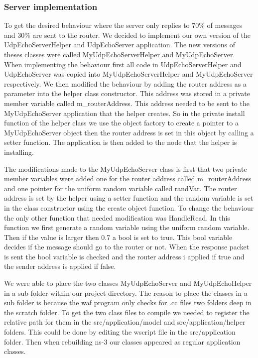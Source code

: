 \documentclass{article}
\begin{document}
\subsubsection{Server implementation}
To get the desired behaviour where the server only replies to 70\% of messages and 30\% are sent to the router.
We decided to implement our own version of the UdpEchoServerHelper and UdpEchoServer application.
The new versions of theses classes were called MyUdpEchoServerHelper and MyUdpEchoServer.
When implementing the behaviour first all code in UdpEchoServerHelper and UdpEchoServer was copied into MyUdpEchoServerHelper and MyUdpEchoServer respectively.
We then modified the behaviour by adding the router address as a parameter into the helper class constructor.
This address was stored in a private member variable called m\_routerAddress.
This address needed to be sent to the MyUdpEchoServer application that the helper creates.
So in the private install function of the helper class we use the object factory to create a pointer to a MyUdpEchoServer object then the router address is set in this object by calling a setter function.
The application is then added to the node that the helper is installing.

The modifications made to the MyUdpEchoServer class is first that two private member variables were added one for the
router address called m\_routerAddress and one pointer for the uniform random variable called randVar.
The router address is set by the helper using a setter function and the random variable is set in the class constructor using the create object function.
To change the behaviour the only other function that needed modification was HandleRead.
In this function we first generate a random variable using the uniform random variable.
Then if the value is larger then 0.7 a bool is set to true.
This bool variable decides if the message should go to the router or not.
When the response packet is sent the bool variable is checked and the router address i applied if true and the sender address is applied if false.

We were able to place the two classes MyUdpEchoServer and MyUdpEchoHelper in a sub folder within our project directory.
The reason to place the classes in a sub folder is because the waf program only checks for .cc files two folders deep in the scratch folder.
To get the two class files to compile we needed to register the relative path for them in the src/application/model and src/application/helper folders.
This could be done by editing the wscript file in the src/application folder.
Then when rebuilding ns-3 our classes appeared as regular application classes.
\end{document}
